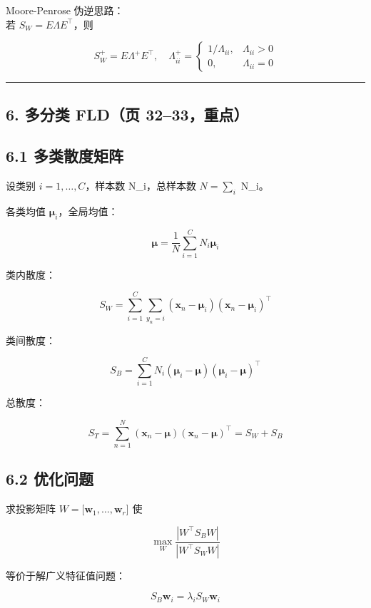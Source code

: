 {{Moore-Penrose 伪逆思路：\\
若 \(S_W=E\Lambda E^\top\)，则

\[
S_W^+=E\Lambda^+E^\top,\quad
\Lambda^+_{ii}=
\begin{cases}
1/\Lambda_{ii}, & \Lambda_{ii}>0\\
0, & \Lambda_{ii}=0
\end{cases}
\]

\begin{center}\rule{0.5\linewidth}{0.5pt}\end{center}

\subsection{6. 多分类 FLD（页
32--33，重点）}\label{ux591aux5206ux7c7b-fldux9875-3233ux91cdux70b9}

\subsection{6.1
多类散度矩阵}\label{ux591aux7c7bux6563ux5ea6ux77e9ux9635}

设类别 \(i=1,\dots,C\)，样本数 N\_i，总样本数 \(N=\sum_i\) N\_i。

各类均值 \(\boldsymbol{\mu}_i\)，全局均值：

\[
\boldsymbol{\mu}=\frac{1}{N}\sum_{i=1}^{C}N_i\boldsymbol{\mu}_i
\]

类内散度：

\[
S_W=\sum_{i=1}^{C}\sum_{y_n=i}
(\mathbf{x}_n-\boldsymbol{\mu}_i)(\mathbf{x}_n-\boldsymbol{\mu}_i)^\top
\]

类间散度：

\[
S_B=\sum_{i=1}^{C}N_i
(\boldsymbol{\mu}_i-\boldsymbol{\mu})
(\boldsymbol{\mu}_i-\boldsymbol{\mu})^\top
\]

总散度：

\[
S_T=
\sum_{n=1}^{N}(\mathbf{x}_n-\boldsymbol{\mu})(\mathbf{x}_n-\boldsymbol{\mu})^\top
=S_W+S_B
\]

\subsection{6.2 优化问题}\label{ux4f18ux5316ux95eeux9898}

求投影矩阵 \(W=[\mathbf{w}_1,\dots,\mathbf{w}_r\){]} 使

\[
\max_W \frac{|W^\top S_B W|}{|W^\top S_W W|}
\]

等价于解广义特征值问题：

\[
S_B\mathbf{w}_i=\lambda_i S_W\mathbf{w}_i
\]

}}
